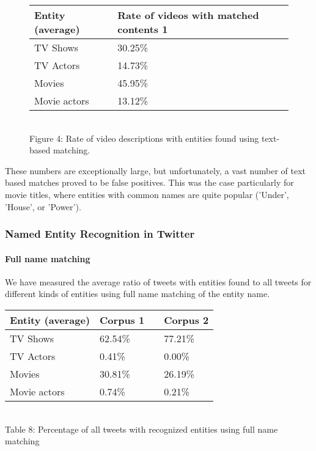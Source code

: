 \begin{figure}[h!]
  \begin{center}
    \begin{tabular}{ | p{4cm} | p{6cm} | } \hline
      Entity (average) & Rate of videos with matched contents 1 \\ \hline
      TV Shows & 30.25\% \\ \hline
      TV Actors & 14.73\% \\ \hline
      Movies & 45.95\% \\ \hline
      Movie actors & 13.12\% \\ \hline
    \end{tabular} \\
    Figure 4: Rate of video descriptions with entities found using text-based matching. \\
  \end{center}
\end{figure}

These numbers are exceptionally large, but unfortunately, a vast number of text
based matches proved to be false positives. This was the case particularly for
movie titles, where entities with common names are quite popular (\eg 'Under',
'House', or 'Power').

\subsubsection{Named Entity Recognition in Twitter}
\paragraph{Full name matching}
We have measured the average ratio of tweets with entities found to all tweets for different kinds of entities using full name matching of the entity name.

\begin{center}
  \begin{tabular}{ | p{4cm} | p{2cm} | p{1cm}| p{2cm} | } \hline
    Entity (average) & Corpus 1 & & Corpus 2 \\ \hline
    TV Shows & 62.54\% & & 77.21\% \\ \hline
    TV Actors & 0.41\% & & 0.00\% \\ \hline
    Movies & 30.81\% & & 26.19\% \\ \hline
    Movie actors & 0.74\% & & 0.21\% \\ \hline
  \end{tabular} \\
  Table 8: Percentage of all tweets with recognized entities using full name matching \\
\end{center}

